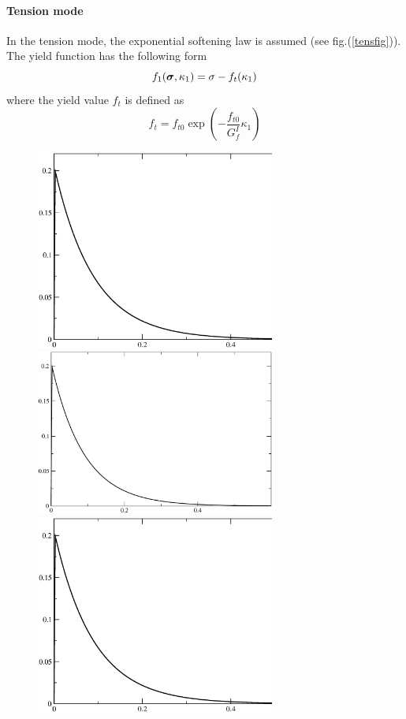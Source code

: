 \documentclass[a4paper]{article}
\newcommand{\mbf}[1]{\mbox{\boldmath$#1$}}
\newcommand{\del}[2]{\mbox{$\displaystyle\frac{#1}{#2}$}}
\newcommand{\sig}{\mbf{\sigma}}
\begin{document}
\paragraph{Tension mode}
In the tension mode, the exponential softening law is assumed (see fig.(\ref{tensfig})). The yield function has the following form
\begin{equation}
  f_1(\sig,\kappa_1) = \sigma-f_t(\kappa_1)
\end{equation}
where the yield value $f_t$ is defined as
\begin{equation}
\label{ft}
  f_t=f_{t0}\exp\left(-\del{f_{t0}}{G^I_f}\kappa_1\right)
\end{equation}
\begin{figure}[!htb]
\begin{htmlonly}
  \centerline{\includegraphics[width=0.7\textwidth]{tension.eps}}
\end{htmlonly}
\ifpdf
 \centerline{\includegraphics[width=0.7\textwidth]{tension.pdf}}
\else
 \centerline{\includegraphics[width=0.7\textwidth]{tension.eps}}

\end{figure}
\end{document}

